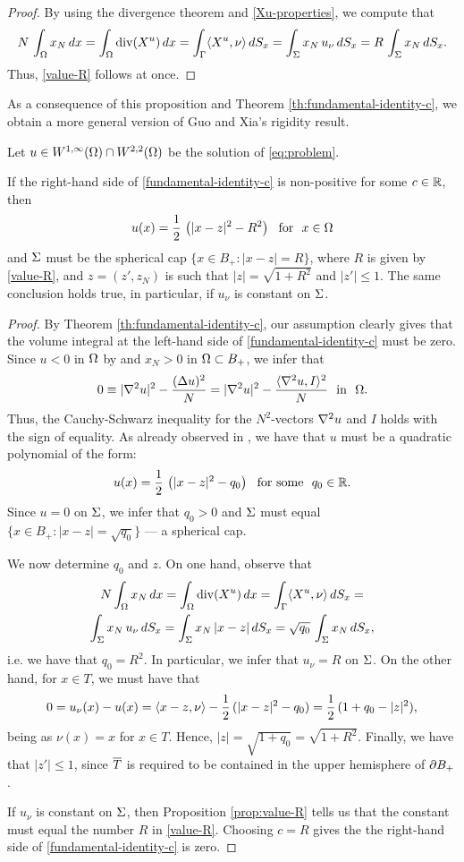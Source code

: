 \documentclass[a4paper,10pt]{amsart}
\numberwithin{equation}{section}
\begin{document}
\begin{proof}
By using the divergence theorem and \eqref{Xu-properties}, we compute that
$$
N\,\int_\Omega x_N\,dx=\int_\Omega\mathop{\mathrm{div}}(X^u)\,dx=\int_\Gamma \langle X^u, \nu\rangle\,dS_x=
\int_\Sigma x_N\,u_\nu\,dS_x=R\,\int_\Sigma x_N\,dS_x .
$$
Thus, \eqref{value-R} follows at once.
\end{proof}

As a consequence of this proposition and Theorem \ref{th:fundamental-identity-c}, we obtain a more general version of Guo and Xia's rigidity result. 

\begin{cor}
Let $u \in W^{1,\infty}(\Omega) \cap W^{2,2} (\Omega)$ be the
solution of \eqref{eq:problem}.  
\par 
If the right-hand side of \eqref{fundamental-identity-c} is non-positive for some $c\in\mathbb{R}$, then 
$$
u(x)=\frac12\,\left(|x-z|^2-R^2\right) \ \mbox{ for } \ x\in\Om
$$
and $\Sigma$ must be the spherical cap 
$\{ x\in B_+: |x-z|=R\}$,
where $R$ is given by \eqref{value-R}, and $z=(z', z_N)$ is such that
$|z|=\sqrt{1+R^2}$ and $|z'|\le 1$.
The same conclusion holds true, in particular, if $u_\nu$ is constant on $\Sigma$. 
\end{cor}

\begin{proof}
By Theorem \ref{th:fundamental-identity-c}, our assumption clearly gives that the volume integral at the left-hand side of \eqref{fundamental-identity-c} must be zero. Since $u<0$ in $\Omega$ by \cite[Proposition 2.3]{GX} and $x_N>0$ in $\Omega\subset B_+$, we infer that 
$$
0\equiv |\na^2 u|^2- \frac{(\De u)^2}{N}=|\na^2 u|^2- \frac{\lan\na^2 u, I\ran^2}{N} \ \mbox{ in } \ \Om.
$$
Thus, the Cauchy-Schwarz inequality for the $N^2$-vectors $\nabla^2 u$ and $I$ holds with the sign of equality. As already observed in \cite{MP2}, we have that $u$ must be a quadratic polynomial of the form:
$$
u(x)=\frac12\, \left( |x-z|^2-q_0 \right) \ \mbox{ for some } \ q_0\in\RR.
$$
Since $u=0$ on $\Sigma$, we infer that $ q_0 >0$ and $\Sigma$ must equal $\{x\in B_+: |x-z|=\sqrt{q_0}\}$ --- a spherical cap.
\par
We now determine $q_0$ and $z$.
On one hand, observe that
\begin{multline*}
N\int_\Omega x_N\,dx=\int_\Omega \mathop{\mathrm{div}} (X^u)\,dx=\int_\Gamma \langle X^u, \nu\rangle\,dS_x= \\
\int_\Sigma x_N\,u_\nu\,dS_x=\int_\Sigma x_N\,|x-z|\,dS_x=\sqrt{q_0}\,\int_\Sigma x_N\,dS_x,
\end{multline*}
i.e. we have that $q_0=R^2$. In particular, we infer that $u_\nu=R$ on $\Sigma$.
On the other hand, for $x\in T$, we must have that
$$
0=u_\nu(x)-u(x)=\langle x-z, \nu\rangle-\frac12\,(|x-z|^2- q_0 )=\frac12\,(1+ q_0 -|z|^2),
$$
being as $\nu(x)=x$ for $x\in T$. Hence, $|z|=\sqrt{1+q_0}=\sqrt{1+R^2}$. Finally, we have that $|z'|\le 1$, since $\overline{T}$ is required to be contained in the upper hemisphere of $\partial B_+$.
\par
If $u_\nu$ is constant on $\Sigma$, then Proposition \ref{prop:value-R} tells us that the constant must equal the number $R$ in \eqref{value-R}. Choosing $c=R$ gives the the right-hand side of \eqref{fundamental-identity-c} is zero.
\end{proof}
\end{document}
